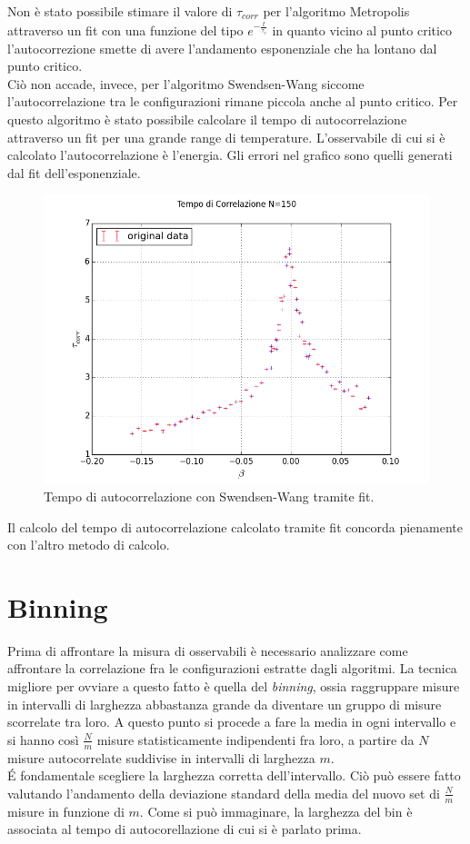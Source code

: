 Non è stato possibile stimare il valore di $\tau_{corr}$ per l'algoritmo Metropolis attraverso un fit con una funzione del tipo $e^{-\frac{t}{\tau_{c}}}$ in quanto vicino al punto critico l'autocorrezione smette di avere l'andamento esponenziale che ha lontano dal punto critico.\\
Ciò non accade, invece, per l'algoritmo Swendsen-Wang siccome l'autocorrelazione tra le configurazioni rimane piccola anche al punto critico.
Per questo algoritmo è stato possibile calcolare il tempo di autocorrelazione attraverso un fit per una grande range di temperature.
L'osservabile di cui si è calcolato l'autocorrelazione è l'energia.
Gli errori nel grafico sono quelli generati dal fit dell'esponenziale.

\begin{figure}
\centering
	\includegraphics[scale=0.55]{sw/autocorrelazioneN150fit.png}
	\caption{Tempo di autocorrelazione con Swendsen-Wang tramite fit.}
\end{figure}
Il calcolo del tempo di autocorrelazione calcolato tramite fit concorda pienamente con l'altro metodo di calcolo.\\


\section{Binning}
Prima di affrontare la misura di osservabili è necessario analizzare come affrontare la correlazione fra le configurazioni estratte dagli algoritmi.
La tecnica migliore per ovviare a questo fatto è quella del \emph{binning}, ossia raggruppare misure in intervalli di larghezza abbastanza grande da diventare un gruppo di misure scorrelate tra loro.
A questo punto si procede a fare la media in ogni intervallo e si hanno così $\frac{N}{m}$ misure statisticamente indipendenti fra loro, a partire da $N$ misure autocorrelate suddivise in intervalli di larghezza $m$.\\
\'E fondamentale scegliere la larghezza corretta dell'intervallo. Ciò può essere fatto valutando l'andamento
della deviazione standard della media del nuovo set di $\frac{N}{m}$ misure in funzione di $m$.
Come si può immaginare, la larghezza del bin è associata al tempo di autocorellazione di cui si è parlato prima.

